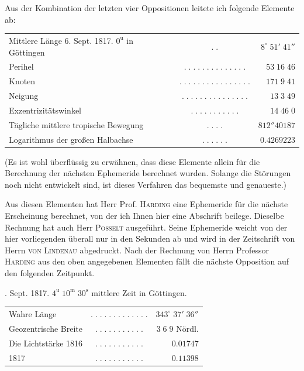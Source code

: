 \par\indent Aus der Kombination der letzten vier Oppositionen leitete ich folgende Elemente ab:
\begin{center}\fontsize{9}{11}\selectfont\setlength{\tabcolsep}{2pt}\renewcommand{\arraystretch}{1.15}\begin{tabular}{lcr}
Mittlere Länge 6. Sept. 1817. $0^{\mathrm u}$ in Göttingen & $.\;.$ & $8^\circ\;51'\;41''$\\
Perihel & $.\;.\;.\;.\;.\;.\;.\;.\;.\;.\;.\;.\;.\;.$ & $53\;16\;46$\\
Knoten & $.\;.\;.\;.\;.\;.\;.\;.\;.\;.\;.\;.\;.\;.\;.\;.$ & $171\;9\;41$\\
Neigung & $.\;.\;.\;.\;.\;.\;.\;.\;.\;.\;.\;.\;.\;.\;.$ & $13\;3\;49$\\
Exzentrizitätswinkel & $.\;.\;.\;.\;.\;.\;.\;.\;.\;.\;.$ & $14\;46\;0$\\
Tägliche mittlere tropische Bewegung & $.\;.\;.\;.$ & $812''40187$\\
Logarithmus der großen Halbachse & $.\;.\;.\;.\;.\;.$ & $0.4269223$\\
\end{tabular}\end{center}

\par\indent (Es ist wohl überflüssig zu erwähnen, dass diese Elemente allein für die Berechnung der nächsten Ephemeride berechnet wurden. Solange die Störungen noch nicht entwickelt sind, ist dieses Verfahren das bequemste und genaueste.)
\par\indent Aus diesen Elementen hat Herr Prof. \textsc{Harding} eine Ephemeride für die nächste Erscheinung berechnet, von der ich Ihnen hier eine Abschrift beilege. Dieselbe Rechnung hat auch Herr \textsc{Posselt} ausgeführt. Seine Ephemeride weicht von der hier vorliegenden überall nur in den Sekunden ab und wird in der Zeitschrift von Herrn \textsc{von Lindenau} abgedruckt. Nach der Rechnung von Herrn Professor \textsc{Harding} aus den oben angegebenen Elementen fällt die nächste Opposition auf den folgenden Zeitpunkt.
\begin{center}\fontsize{10}{12}. Sept. 1817. $4^{\mathrm u}\;10^{\mathrm m}\;30^{\mathrm s}$ mittlere Zeit in Göttingen.\par
\setlength{\tabcolsep}{3pt}\begin{tabular}{lcr}
Wahre Länge & $.\;.\;.\;.\;.\;.\;.\;.\;.\;.\;.\;.\;.$ & $343^\circ\;37'\;36''$\\
Geozentrische Breite & $.\;.\;.\;.\;.\;.\;.\;.\;.\;.\;.$ & $3\;6\;9$ Nördl.\\
Die Lichtstärke 1816 & $.\;.\;.\;.\;.\;.\;.\;.\;.\;.\;.$ & $0.01747$\\
\hfill1817 & $.\;.\;.\;.\;.\;.\;.\;.\;.\;.\;.$ & $0.11398$\\
\end{tabular}\end{center}

